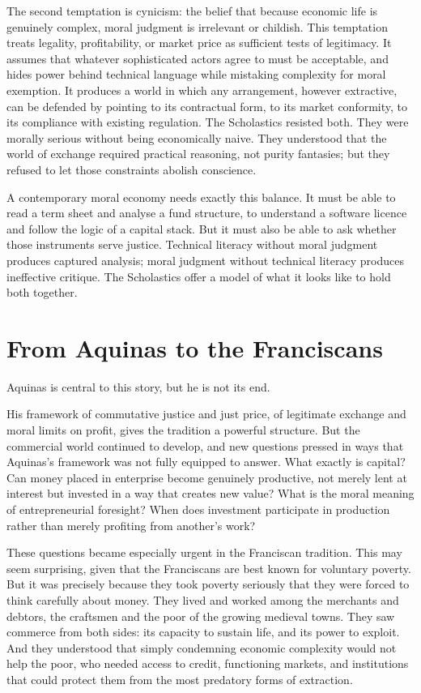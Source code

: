 \documentclass[11pt,a4paper,oneside]{book}
\begin{document}
The second temptation is cynicism: the belief that because economic life is genuinely complex, moral judgment is irrelevant or childish. This temptation treats legality, profitability, or market price as sufficient tests of legitimacy. It assumes that whatever sophisticated actors agree to must be acceptable, and hides power behind technical language while mistaking complexity for moral exemption. It produces a world in which any arrangement, however extractive, can be defended by pointing to its contractual form, to its market conformity, to its compliance with existing regulation. The Scholastics resisted both. They were morally serious without being economically naive. They understood that the world of exchange required practical reasoning, not purity fantasies; but they refused to let those constraints abolish conscience.

A contemporary moral economy needs exactly this balance. It must be able to read a term sheet and analyse a fund structure, to understand a software licence and follow the logic of a capital stack. But it must also be able to ask whether those instruments serve justice. Technical literacy without moral judgment produces captured analysis; moral judgment without technical literacy produces ineffective critique. The Scholastics offer a model of what it looks like to hold both together.

\section*{From Aquinas to the Franciscans}

Aquinas is central to this story, but he is not its end.

His framework of commutative justice and just price, of legitimate exchange and moral limits on profit, gives the tradition a powerful structure. But the commercial world continued to develop, and new questions pressed in ways that Aquinas's framework was not fully equipped to answer. What exactly is capital? Can money placed in enterprise become genuinely productive, not merely lent at interest but invested in a way that creates new value? What is the moral meaning of entrepreneurial foresight? When does investment participate in production rather than merely profiting from another's work?

These questions became especially urgent in the Franciscan tradition. This may seem surprising, given that the Franciscans are best known for voluntary poverty. But it was precisely because they took poverty seriously that they were forced to think carefully about money. They lived and worked among the merchants and debtors, the craftsmen and the poor of the growing medieval towns. They saw commerce from both sides: its capacity to sustain life, and its power to exploit. And they understood that simply condemning economic complexity would not help the poor, who needed access to credit, functioning markets, and institutions that could protect them from the most predatory forms of extraction.
\end{document}
